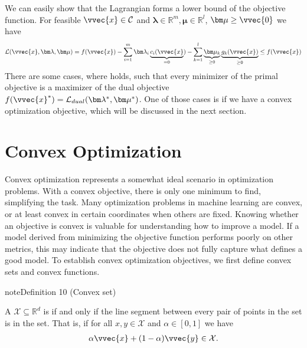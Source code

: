 \documentclass[letterpaper,10pt,english]{jupyterBook}
\begin{document}
\sphinxAtStartPar
We can easily show that the Lagrangian forms a lower bound of the objective function. For feasible \(\vvec{x}\in\mathcal{C}\) and \(\bm\lambda\in\mathbb{R}^m,\bm\mu\in\mathbb{R}^l\), \(\bm\mu\geq \vvec{0}\) we have
\begin{equation*}
\begin{split}\mathcal{L}(\vvec{x},\bm\lambda,\bm\mu) = f(\vvec{x}) - \sum_{i=1}^m\bm\lambda_i \underbrace{c_i(\vvec{x}}_{=0}) - \sum_{k=1}^l\underbrace{\bm\mu_k}_{\geq 0} \underbrace{g_k(\vvec{x})}_{\geq 0}\leq f(\vvec{x})\end{split}
\end{equation*}
There are some cases, where  holds, such that every minimizer of the primal objective is a maximizer of the dual objective \(f(\vvec{x}^*)= \mathcal{L}_{dual}(\bm\lambda^*,\bm\mu^*)\). One of those cases is if we have a convex optimization objective, which will be discussed in the next section.

\sphinxstepscope


\section{Convex Optimization}
\label{\detokenize{optimization_convex:convex-optimization}}\label{\detokenize{optimization_convex::doc}}
\sphinxAtStartPar
Convex optimization represents a somewhat ideal scenario in optimization problems. With a convex objective, there is only one minimum to find, simplifying the task. Many optimization problems in machine learning are convex, or at least convex in certain coordinates when others are fixed. Knowing whether an objective is convex is valuable for understanding how to improve a model. If a model derived from minimizing the objective function performs poorly on other metrics, this may indicate that the objective does not fully capture what defines a good model. To establish convex optimization objectives, we first define convex sets and convex functions.
\label{optimization_convex:convex_set}
\begin{sphinxadmonition}{note}{Definition 10 (Convex set)}



\sphinxAtStartPar
A  \(\mathcal{X}\subseteq \mathbb{R}^d\) is  if and only if the line segment between every pair of points in the set is in the set.
That is, if for all \(x,y\in \mathcal{X}\) and \(\alpha\in[0,1]\) we have
\begin{equation*}
\begin{split}\alpha \vvec{x}+(1-\alpha) \vvec{y}\in\mathcal{X}.\end{split}
\end{equation*}
\end{sphinxadmonition}
\end{document}
